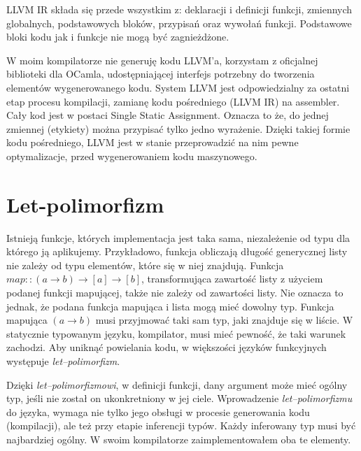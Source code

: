 \documentclass[declaration,shortabstract]{iithesis}
\begin{document}
LLVM IR składa się przede wszystkim z: deklaracji i definicji funkcji, zmiennych globalnych, 
podstawowych bloków, przypisań oraz wywołań funkcji. Podstawowe bloki kodu jak i funkcje nie 
mogą być zagnieżdżone. 

W moim kompilatorze nie generuję kodu LLVM'a, korzystam z oficjalnej biblioteki dla OCamla, 
udostępniającej interfejs potrzebny do tworzenia elementów wygenerowanego kodu. System LLVM 
jest odpowiedzialny za ostatni etap procesu kompilacji, zamianę kodu pośredniego (LLVM IR) 
na assembler. Cały kod jest w postaci Single Static Assignment. Oznacza to że, 
do jednej zmiennej (etykiety) można przypisać tylko jedno wyrażenie. 
Dzięki takiej formie kodu pośredniego, LLVM jest w 
stanie przeprowadzić na nim pewne optymalizacje, przed wygenerowaniem kodu 
maszynowego. 



\section{Let-polimorfizm}

Istnieją funkcje, których implementacja jest taka sama, niezależenie od typu dla
którego ją aplikujemy. Przykładowo, funkcja obliczają długość generycznej listy 
nie zależy od typu elementów, które się w niej znajdują. Funkcja $map :: (a 
\rightarrow b) \rightarrow [a] \rightarrow [b]$, transformująca zawartość listy 
z użyciem podanej funkcji mapującej, także nie zależy od zawartości listy. Nie 
oznacza to jednak, że podana funkcja mapująca i lista mogą mieć dowolny typ. 
Funkcja mapująca $(a \rightarrow b)$ musi przyjmować taki sam typ, jaki znajduje się w liście. W statycznie typowanym języku, kompilator, musi mieć 
pewność, że taki warunek zachodzi. Aby uniknąć powielania kodu, w większości języków funkcyjnych 
występuje \textit{let--polimorfizm}. 

Dzięki \textit{let--polimorfizmowi}, w definicji funkcji, dany argument może 
mieć ogólny typ, jeśli nie został on ukonkretniony w jej ciele.
Wprowadzenie \textit{let--polimorfizmu} do języka, wymaga nie tylko jego obsługi 
w procesie generowania kodu (kompilacji), ale też przy etapie inferencji typów.
Każdy inferowany typ musi być najbardziej ogólny. W swoim kompilatorze 
zaimplementowałem oba te elementy. 
\end{document}
